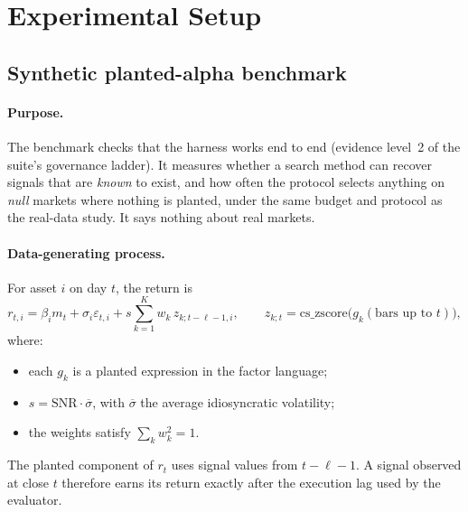 \section{Experimental Setup}
\label{sec:setup}

\subsection{Synthetic planted-alpha benchmark}
\label{sec:synthetic}

\paragraph{Purpose.} The benchmark checks that the harness works end to end
(evidence level~2 of the suite's governance ladder). It measures whether a
search method can recover signals that are \emph{known} to exist, and how
often the protocol selects anything on \emph{null} markets where nothing is
planted, under the same budget and protocol as the real-data study. It says
nothing about real markets.

\paragraph{Data-generating process.} For asset $i$ on day $t$, the return is
\[
r_{t,i}=\beta_i m_t+\sigma_i\varepsilon_{t,i}
      +s\sum_{k=1}^{K}w_k\,z_{k;t-\ell-1,i},\qquad
z_{k;t}=\mathrm{cs\_zscore}\big(g_k(\text{bars up to }t)\big),
\]
where:
\begin{itemize}
  \item each $g_k$ is a planted expression in the factor language;
  \item $s=\mathrm{SNR}\cdot\overline{\sigma}$, with $\overline{\sigma}$ the
    average idiosyncratic volatility;
  \item the weights satisfy $\sum_k w_k^2=1$.
\end{itemize}
The planted component of $r_t$ uses signal values from $t-\ell-1$. A signal
observed at close $t$ therefore earns its return exactly after the execution
lag used by the evaluator.


